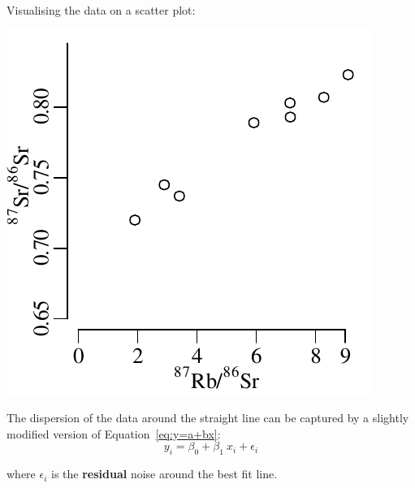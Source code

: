 Visualising the data on a scatter plot:

\noindent\begin{minipage}[t][][b]{.3\textwidth}
  \includegraphics[width=\textwidth]{../figures/RbSr.pdf}\\
\end{minipage}
\begin{minipage}[t][][t]{.7\textwidth}
  \label{fig:Rb-Sr}
\end{minipage}

The dispersion of the data around the straight line can be captured by
a slightly modified version of Equation~\ref{eq:y=a+bx}:
\begin{equation}
  y_i = \beta_0 + \beta_1~x_i + \epsilon_i
  \label{eq:y=a+bx+e}
\end{equation}

\noindent where $\epsilon_i$ is the \textbf{residual} noise around the
best fit line.\\

